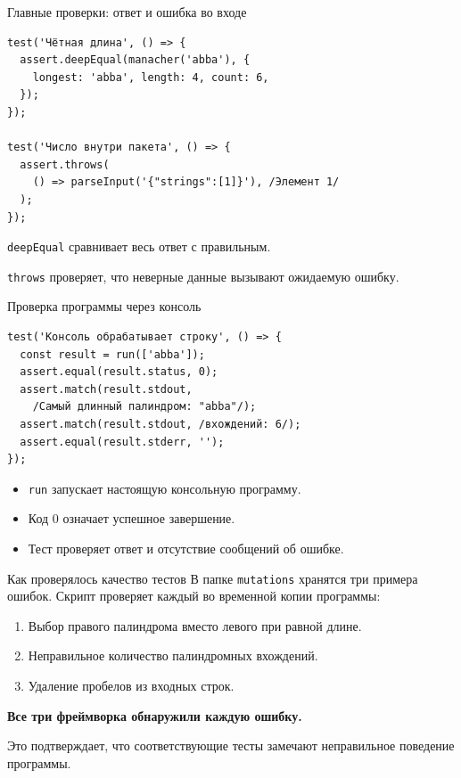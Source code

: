 \documentclass[aspectratio=169,11pt]{beamer}
\begin{document}
\begin{frame}[fragile]{Главные проверки: ответ и ошибка во входе}
\begin{Verbatim}[fontsize=\small]
test('Чётная длина', () => {
  assert.deepEqual(manacher('abba'), {
    longest: 'abba', length: 4, count: 6,
  });
});

test('Число внутри пакета', () => {
  assert.throws(
    () => parseInput('{"strings":[1]}'), /Элемент 1/
  );
});
\end{Verbatim}
\texttt{deepEqual} сравнивает весь ответ с правильным.\par
\texttt{throws} проверяет, что неверные данные вызывают ожидаемую ошибку.
\end{frame}

\begin{frame}[fragile]{Проверка программы через консоль}
\begin{Verbatim}[fontsize=\small]
test('Консоль обрабатывает строку', () => {
  const result = run(['abba']);
  assert.equal(result.status, 0);
  assert.match(result.stdout,
    /Самый длинный палиндром: "abba"/);
  assert.match(result.stdout, /вхождений: 6/);
  assert.equal(result.stderr, '');
});
\end{Verbatim}
\begin{itemize}
\item \texttt{run} запускает настоящую консольную программу.
\item Код 0 означает успешное завершение.
\item Тест проверяет ответ и отсутствие сообщений об ошибке.
\end{itemize}
\end{frame}

\begin{frame}{Как проверялось качество тестов}
В папке \texttt{mutations} хранятся три примера ошибок. Скрипт проверяет каждый во временной копии программы:
\begin{enumerate}
\item Выбор правого палиндрома вместо левого при равной длине.
\item Неправильное количество палиндромных вхождений.
\item Удаление пробелов из входных строк.
\end{enumerate}
\vspace{3mm}
\textbf{Все три фреймворка обнаружили каждую ошибку.}\par
Это подтверждает, что соответствующие тесты замечают неправильное поведение программы.
\end{frame}
\end{document}
